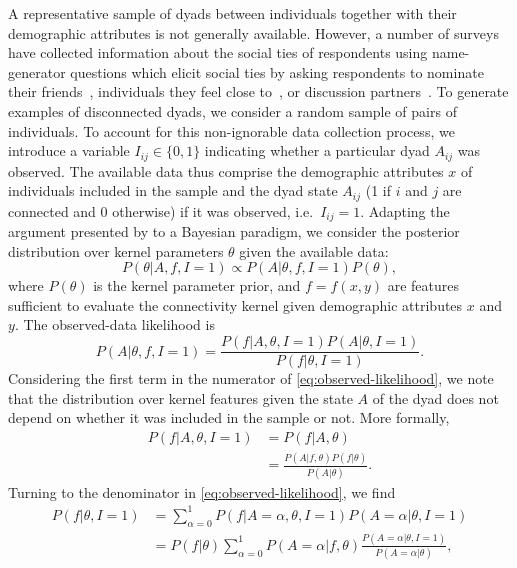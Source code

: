 \documentclass{scrartcl}
\newcommand{\observed}[1]{#1}
\begin{document}
A representative sample of dyads between individuals together with their demographic attributes is not generally available. However, a number of surveys have collected information about the social ties of respondents using name-generator questions which elicit social ties by asking respondents to nominate their friends~\cite{Kalmijn2007}, individuals they feel close to~\cite{Hipp2009}, or discussion partners~\cite{Marsden1987,McPherson2006}. To generate examples of disconnected dyads, we consider a random sample of pairs of individuals. To account for this non-ignorable data collection process, we introduce a variable $I_{ij}\in\{0,1\}$ indicating whether a particular dyad $A_{ij}$ was observed. The available data thus comprise the demographic attributes $x$ of individuals included in the sample and the dyad state $A_{ij}$ (1 if $i$ and $j$ are connected and $0$ otherwise) if it was observed, i.e.\ $I_{ij}=1$. Adapting the argument presented by \textcite{King2001} to a Bayesian paradigm, we consider the posterior distribution over kernel parameters $\theta$ given the available data:
\begin{equation}
    P(\theta|\observed{A}, \observed{f}, I=1)\propto P(\observed{A}|\theta,\observed{f},I=1)P(\theta),\label{eq:parameter-posterior}
\end{equation}
where $P(\theta)$ is the kernel parameter prior, and $f=f(x,y)$ are features sufficient to evaluate the connectivity kernel given demographic attributes $x$ and $y$.
The observed-data likelihood is
\begin{equation}
    P(\observed{A}|\theta,\observed{f},I=1)=\frac{P(\observed{f}|\observed{A},\theta,I=1)P(\observed{A}|\theta,I=1)}{P(\observed{f}|\theta,I=1)}.\label{eq:observed-likelihood}
\end{equation}
Considering the first term in the numerator of \cref{eq:observed-likelihood}, we note that the distribution over kernel features given the state $A$ of the dyad does not depend on whether it was included in the sample or not. More formally,
\begin{align}
    P(f|A,\theta,I=1)&=P(f|A,\theta)\\
    &=\frac{P(A|f,\theta)P(f|\theta)}{P(A|\theta)}.\label{eq:conditional-equivalence}
\end{align}
Turning to the denominator in \cref{eq:observed-likelihood}, we find
\begin{align}
    P(f|\theta,I=1)&=\sum_{\alpha=0}^1 P(f|A=\alpha,\theta,I=1)P(A=\alpha|\theta,I=1)\nonumber\\
    &=P(f|\theta)\sum_{\alpha=0}^1 P(A=\alpha|f,\theta)\frac{P(A=\alpha|\theta,I=1)}{P(A=\alpha|\theta)},\label{eq:likelihood-denominator}
\end{align}
\end{document}
